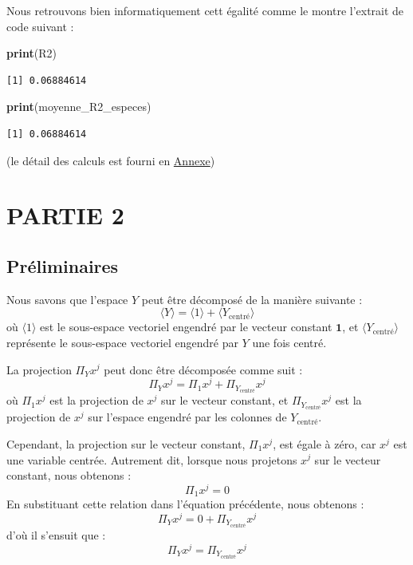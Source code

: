 \documentclass[
]{article}
\newenvironment{Shaded}{\begin{snugshade}}{\end{snugshade}}
\newcommand{\FunctionTok}[1]{\textcolor[rgb]{0.13,0.29,0.53}{\textbf{#1}}}
\newcommand{\NormalTok}[1]{#1}
\begin{document}
Nous retrouvons bien informatiquement cett égalité comme le montre
l'extrait de code suivant :

\begin{Shaded}
\begin{Highlighting}[]
\FunctionTok{print}\NormalTok{(R2)}
\end{Highlighting}
\end{Shaded}

\begin{verbatim}
[1] 0.06884614
\end{verbatim}

\begin{Shaded}
\begin{Highlighting}[]
\FunctionTok{print}\NormalTok{(moyenne\_R2\_especes)}
\end{Highlighting}
\end{Shaded}

\begin{verbatim}
[1] 0.06884614
\end{verbatim}

(le détail des calculs est fourni en \protect\hyperlink{annexe}{Annexe})

\newpage

\hypertarget{partie-2}{%
\section{PARTIE 2}\label{partie-2}}

\hypertarget{pruxe9liminaires}{%
\subsection{Préliminaires}\label{pruxe9liminaires}}

Nous savons que l'espace \(Y\) peut être décomposé de la manière
suivante : \[
\langle Y \rangle = \langle 1 \rangle + \langle Y_{\text{centré}} \rangle
\] où \(\langle 1 \rangle\) est le sous-espace vectoriel engendré par le
vecteur constant \(\mathbf{1}\), et
\(\langle Y_{\text{centré}} \rangle\) représente le sous-espace
vectoriel engendré par \(Y\) une fois centré.

La projection \(\Pi_Y x^j\) peut donc être décomposée comme suit : \[
\Pi_Y x^j = \Pi_1 x^j + \Pi_{Y_{\text{centré}}} x^j
\] où \(\Pi_1 x^j\) est la projection de \(x^j\) sur le vecteur
constant, et \(\Pi_{Y_{\text{centré}}} x^j\) est la projection de
\(x^j\) sur l'espace engendré par les colonnes de \(Y_{\text{centré}}\).

Cependant, la projection sur le vecteur constant, \(\Pi_1 x^j\), est
égale à zéro, car \(x^j\) est une variable centrée. Autrement dit,
lorsque nous projetons \(x^j\) sur le vecteur constant, nous obtenons :
\[
\Pi_1 x^j = 0
\] En substituant cette relation dans l'équation précédente, nous
obtenons : \[
\Pi_Y x^j = 0 + \Pi_{Y_{\text{centré}}} x^j
\] d'où il s'ensuit que : \[
\Pi_Y x^j = \Pi_{Y_{\text{centré}}} x^j
\]
\end{document}
